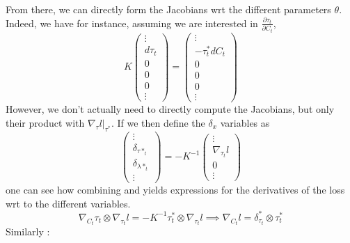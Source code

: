 \documentclass[a4paper,11pt]{article}
\begin{document}
%
From there, we can directly form the Jacobians wrt the different parameters $\theta$. Indeed, we have for instance, assuming we are interested in $\frac{\partial \tau_t}{\partial C_t}$,
\begin{equation}
    K \begin{pmatrix}
        \vdots \\
        d\tau_t
        \\0
        \\0
        \\0
        \\ \vdots
    \end{pmatrix} = \begin{pmatrix}\vdots         \\
        -\tau_t^* dC_t \\
        0              \\
        0              \\
        0              \\
        \vdots
    \end{pmatrix}
\end{equation}
However, we don't actually need to directly compute the Jacobians, but only their product with $\nabla_\tau l |_{\tau^*}$. If we then define the $\delta_x$ variables as
\begin{equation}
    \label{eq:delta_eq}
    \begin{pmatrix}
        \vdots \\
        \delta_{\tau*_t}
        \\ \delta_{\lambda*_t}
        \\ \vdots
    \end{pmatrix} = -K^{-1}\begin{pmatrix}\vdots            \\
        \nabla_{\tau_t }l \\
        0                 \\
        \vdots
    \end{pmatrix}
\end{equation}
one can see how combining  and  yields expressions for the derivatives of the loss wrt to the different variables.
\begin{equation}
    \label{eq:13}
    \nabla_{C_t}\tau_t \otimes \nabla_{\tau_t}l  = -K^{-1}\tau_t^*
    \otimes \nabla_{\tau_t }l \implies  \nabla_{C_t}l  = \delta^*_{\tau_t} \otimes \tau^*_t
\end{equation}
Similarly :
\end{document}
